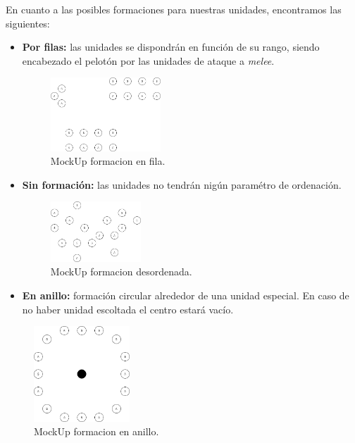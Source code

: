 En cuanto a las posibles formaciones para nuestras unidades, encontramos las siguientes:

\begin{itemize}
\item \textbf{Por filas:} las unidades se dispondrán en función de su rango,
siendo encabezado el pelotón por las unidades de ataque a \textit{melee}.

\begin{figure}[ht]
\centering
\includegraphics[width=0.39\textwidth]{imagenes/gdd/Formacion-en-fila.png}
\caption{MockUp formacion en fila.}
\label{mockup_en_fila}
\end{figure}

\item \textbf{Sin formación:} las unidades no tendrán nigún paramétro de ordenación.

\begin{figure}[ht]
\centering
\includegraphics[width=0.32\textwidth]{imagenes/gdd/Formacion-desordenada.png}
\caption{MockUp formacion desordenada.}
\label{mockup_desordenada}
\end{figure}

\item \textbf{En anillo:} formación circular alrededor de una unidad especial. En caso de
no haber unidad escoltada el centro estará vacío. 
\end{itemize} 


\begin{figure}[ht]
\centering
\includegraphics[width=0.32\textwidth]{imagenes/gdd/Formacion-anillo.png}
\caption{MockUp formacion en anillo.}
\label{mockup_anillo}
\end{figure}

